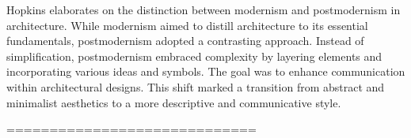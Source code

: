 Hopkins elaborates on the distinction between modernism and postmodernism in architecture\cite{Hopkins2020}.
While modernism aimed to distill architecture to its essential fundamentals, postmodernism adopted a contrasting approach.
Instead of simplification, postmodernism embraced complexity by layering elements and incorporating various ideas and symbols. The goal was to enhance communication within architectural designs. This shift marked a transition from abstract and minimalist aesthetics to a more descriptive and communicative style.

=============================









